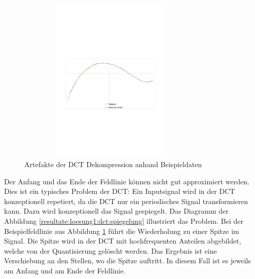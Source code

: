 \begin{figure}[!htbp]
	\center
	\includegraphics[trim = 1.8cm 9.8cm 1.8cm 11.2cm, clip=true, width=0.8\textwidth,height=8cm,keepaspectratio]{./pictures/resultate/loesung1/loesung1-0/loesung1_0_artefakte.pdf}
	\caption{Artefakte der DCT Dekompression anhand Beispieldaten}
	\label{resultate:loesung1:dct:artefakte}
\end{figure}
Der Anfang und das Ende der Feldlinie können nicht gut approximiert werden. Dies ist ein typisches Problem der DCT: Ein Inputsignal wird in der DCT konzeptionell repetiert, da die DCT nur ein periodisches Signal transformieren kann. Dazu wird konzeptionell das Signal gespiegelt. Das Diagramm der Abbildung \ref{resultate:loesung1:dct:spiegelung} illustriert das Problem. Bei der Beispielfeldlinie aus Abbildung \ref{resultate:loesung1:dct:artefakte} führt die Wiederholung zu einer Spitze im Signal. Die Spitze wird in der DCT mit hochfrequenten Anteilen abgebildet, welche von der Quantisierung gelöscht werden. Das Ergebnis ist eine Verschiebung an den Stellen, wo die Spitze auftritt. In diesem Fall ist es jeweils am Anfang und am Ende der Feldlinie.

